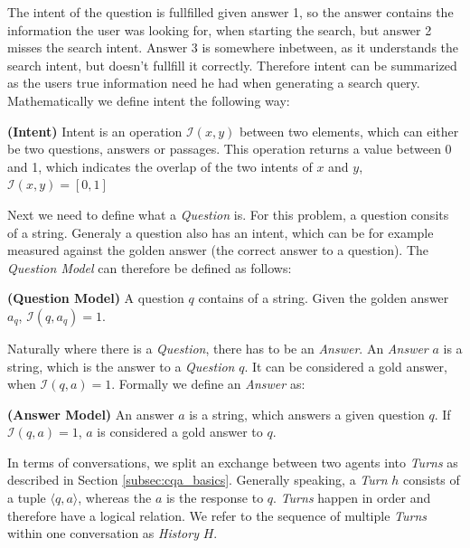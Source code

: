 The intent of the question is fullfilled given answer 1, so the answer contains the information the user was looking for, when starting the search, but answer 2 misses the search intent. Answer 3 is somewhere inbetween, as it understands the search intent, but doesn't fullfill it correctly. Therefore intent can be summarized as the users true information need he had when generating a search query. Mathematically we define intent the following way:

\begin{definition}
    \textbf{(Intent)} Intent is an operation $\mathcal{I}(x, y)$ between two elements, which can either be two questions, answers or passages. This operation returns a value between 0 and 1, which indicates the overlap of the two intents of $x$ and $y$, $\mathcal{I}(x, y) = [0,1]$ 
    \label{def:intent}
\end{definition}

Next we need to define what a \textit{Question} is. For this problem, a question consits of a string. Generaly a question also has an intent, which can be for example measured against the golden answer (the correct answer to a question). The \textit{Question Model} can therefore be defined as follows:

\begin{definition}
    \textbf{(Question Model)} A question $q$ contains of a string. Given the golden answer $a_q$, $\mathcal{I}(q, a_q) = 1$.
    \label{def:question_model}
\end{definition}

Naturally where there is a \textit{Question}, there has to be an \textit{Answer}. An \textit{Answer} $a$ is a string, which is the answer to a \textit{Question} $q$. It can be considered a gold answer, when $\mathcal{I}(q,a) = 1$. Formally we define an \textit{Answer} as:

\begin{definition}
    \textbf{(Answer Model)} An answer $a$ is a string, which answers a given question $q$. If $\mathcal{I}(q,a) = 1$, $a$ is considered a gold answer to $q$.
    \label{def:answer_model}
\end{definition}

In terms of conversations, we split an exchange between two agents into \textit{Turns} as described in Section \ref{subsec:cqa_basics}. Generally speaking, a \textit{Turn} $h$ consists of a tuple $\langle q,a\rangle$, whereas the $a$ is the response to $q$. \textit{Turns} happen in order and therefore have a logical relation. We refer to the sequence of multiple \textit{Turns} within one conversation as \textit{History} $H$.


